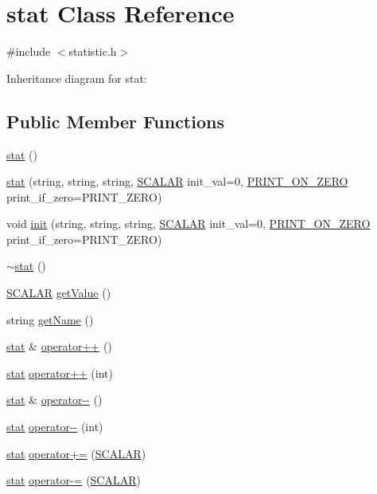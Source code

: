 \hypertarget{classstat}{
\section{stat Class Reference}
\label{classstat}
}


{\ttfamily \#include $<$statistic.h$>$}



Inheritance diagram for stat:
\subsection*{Public Member Functions}
\begin{DoxyCompactItemize}
\item 
\hyperlink{classstat_ab89727a4198ffd032e194917596e156b}{stat} ()
\item 
\hyperlink{classstat_abe66f5d22b8d2da86c0dd0dded862189}{stat} (string, string, string, \hyperlink{global_2global_8h_a72e6b2d6dce7827a0bbf126287d2035a}{SCALAR} init\_\-val=0, \hyperlink{statistic_8h_a007ca0df4ad593f8771581e5b51584f4}{PRINT\_\-ON\_\-ZERO} print\_\-if\_\-zero=PRINT\_\-ZERO)
\item 
void \hyperlink{classstat_aacfea127fcaab87cfb226e132ba4b23a}{init} (string, string, string, \hyperlink{global_2global_8h_a72e6b2d6dce7827a0bbf126287d2035a}{SCALAR} init\_\-val=0, \hyperlink{statistic_8h_a007ca0df4ad593f8771581e5b51584f4}{PRINT\_\-ON\_\-ZERO} print\_\-if\_\-zero=PRINT\_\-ZERO)
\item 
\hyperlink{classstat_adb268824871b2f69d7b11003abf2fe6b}{$\sim$stat} ()
\item 
\hyperlink{global_2global_8h_a72e6b2d6dce7827a0bbf126287d2035a}{SCALAR} \hyperlink{classstat_a466c0cff1754602817a62517d74a1d07}{getValue} ()
\item 
string \hyperlink{classstat_af4666e7a7eac1259a222685465e086be}{getName} ()
\item 
\hyperlink{classstat}{stat} \& \hyperlink{classstat_ad4b4362a2144dd4510f927a2a4243314}{operator++} ()
\item 
\hyperlink{classstat}{stat} \hyperlink{classstat_a685468cc920d73914ee5f319ab61bdc5}{operator++} (int)
\item 
\hyperlink{classstat}{stat} \& \hyperlink{classstat_ae2fd50f98dab5561bd987bcca24aa0fa}{operator-\/-\/} ()
\item 
\hyperlink{classstat}{stat} \hyperlink{classstat_a8c5a7ec08fb94918564dee66a3ecb260}{operator-\/-\/} (int)
\item 
\hyperlink{classstat}{stat} \hyperlink{classstat_ae5697e9246673d121c5d5f190582ec6a}{operator+=} (\hyperlink{global_2global_8h_a72e6b2d6dce7827a0bbf126287d2035a}{SCALAR})
\item 
\hyperlink{classstat}{stat} \hyperlink{classstat_abfceb9f1f9d7dd4405dae4d7856aa3a0}{operator-\/=} (\hyperlink{global_2global_8h_a72e6b2d6dce7827a0bbf126287d2035a}{SCALAR})
\end{DoxyCompactItemize}
